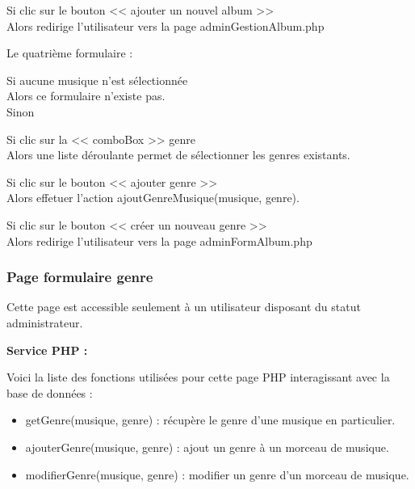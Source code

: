 			\begin{paragraphe}
				Si clic sur le bouton << ajouter un nouvel album >> \\
				Alors redirige l'utilisateur vers la page adminGestionAlbum.php
			\end{paragraphe}

			\begin{paragraphe}
				Le quatrième formulaire :
			\end{paragraphe}

			\begin{paragraphe}
				Si aucune musique n'est sélectionnée \\
				Alors ce formulaire n'existe pas. \\
				Sinon
			\end{paragraphe}

			\begin{paragraphe}
				Si clic sur la << comboBox >> genre \\
				Alors une liste déroulante permet de sélectionner les genres existants.
			\end{paragraphe}

			\begin{paragraphe}
				Si clic sur le bouton << ajouter genre >> \\
				Alors effetuer l'action ajoutGenreMusique(musique, genre).
			\end{paragraphe}

			\begin{paragraphe}
				Si clic sur le bouton << créer un nouveau genre >> \\
				Alors redirige l'utilisateur vers la page adminFormAlbum.php
			\end{paragraphe}

	\clearpage

		\subsubsection{Page formulaire genre}

			\begin{paragraphe}
				Cette page est accessible seulement à un utilisateur disposant du statut administrateur.
			\end{paragraphe}

			\begin{paragraphe}
				\textbf{Service PHP :}
			\end{paragraphe}

			\begin{paragraphe}
				Voici la liste des fonctions utilisées pour cette page PHP interagissant avec la base de données :
				\begin{itemize}
					\item getGenre(musique, genre) : récupère le genre d'une musique en particulier.
					\item ajouterGenre(musique, genre) : ajout un genre à un morceau de musique.
					\item modifierGenre(musique, genre) : modifier un genre d'un morceau de musique.
				\end{itemize}
			\end{paragraphe}

